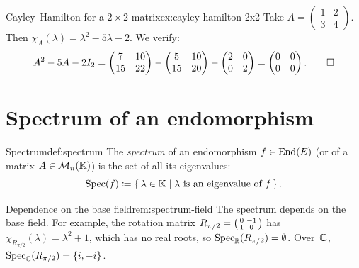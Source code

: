 \begin{example}{Cayley--Hamilton for a $2\times 2$ matrix}{ex:cayley-hamilton-2x2}
Take $A = \begin{pmatrix} 1 & 2 \\ 3 & 4 \end{pmatrix}$.  Then
$\chi_A(\lambda) = \lambda^2 - 5\lambda - 2$.  We verify:
\[
  A^2 - 5A - 2I_2
  = \begin{pmatrix}7 & 10 \\ 15 & 22\end{pmatrix}
  - \begin{pmatrix}5 & 10 \\ 15 & 20\end{pmatrix}
  - \begin{pmatrix}2 & 0 \\ 0 & 2\end{pmatrix}
  = \begin{pmatrix}0 & 0 \\ 0 & 0\end{pmatrix}.\qedhere
\]
\end{example}


\section{Spectrum of an endomorphism}\label{sec:spectrum}

\begin{definition}{Spectrum}{def:spectrum}
The \emph{spectrum} of an endomorphism $f\in\operatorname{End}(E)$ (or of a matrix
$A\in\mathcal{M}_n({\mathbb{K}})$) is the set of all its eigenvalues:
\[
  \operatorname{Spec}(f) \coloneqq \left\{\,\lambda\in{\mathbb{K}}\;\middle|\;\lambda \text{ is an eigenvalue of } f\,\right\}.
\]
\end{definition}

\begin{remark}{Dependence on the base field}{rem:spectrum-field}
The spectrum depends on the base field.  For example, the rotation
matrix $R_{\pi/2} = \begin{psmallmatrix} 0 & -1 \\ 1 & 0
\end{psmallmatrix}$ has $\chi_{R_{\pi/2}}(\lambda) = \lambda^2 + 1$,
which has no real roots, so $\operatorname{Spec}_{\mathbb{R}}(R_{\pi/2}) = \emptyset$.
Over~${\mathbb{C}}$, $\operatorname{Spec}_{\mathbb{C}}(R_{\pi/2}) = \left\{i,-i\right\}$.
\end{remark}


